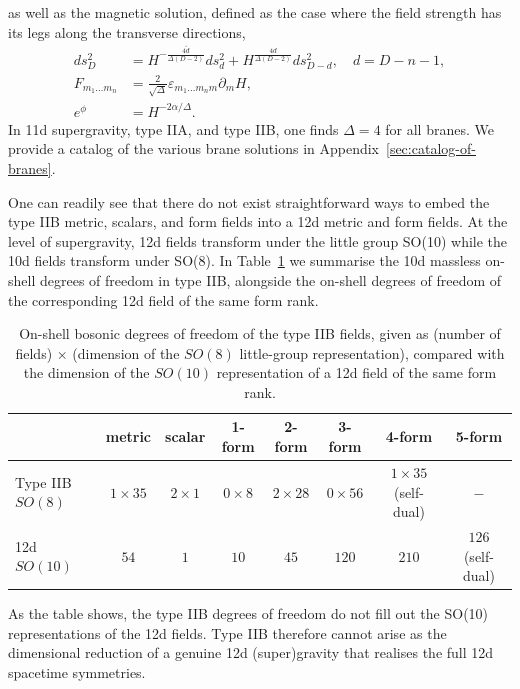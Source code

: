 as well as the magnetic solution, defined as the case where the field strength has its legs along the transverse directions,
\begin{equation}
\begin{aligned}
ds_D^2
&=H^{-\frac{4\tilde d}{\Delta(D-2)}}ds_{d}^2+
H^{\frac{4d}{\Delta(D-2)}}ds_{D-d}^2,\quad
d = D-n-1,\\
F_{m_1...m_n}
&= \frac{2}{\sqrt{\Delta}}\varepsilon_{m_1...m_n m}\partial_m H,\\
e^\phi &= H^{-2\alpha/\Delta}.
\end{aligned}
\end{equation}
In 11d supergravity, type IIA, and type IIB, one finds $\Delta = 4$ for all branes.
We provide a catalog of the various brane solutions in Appendix~\ref{sec:catalog-of-branes}.

One can readily see that there do not exist straightforward ways to embed the type IIB metric, scalars, and form fields into a 12d metric and form fields.
At the level of supergravity, 12d fields transform under the little group SO(10) while the 10d fields transform under SO(8).
In Table~\ref{tab:10d-12d-dof} we summarise the 10d massless on-shell degrees of freedom in type IIB, alongside the on-shell degrees of freedom of the corresponding 12d field of the same form rank.

\begin{table}[h]
\centering
\begin{tabular}{l|ccccccc}
\hline
 & metric & scalar & 1-form & 2-form & 3-form & 4-form & 5-form \\
\hline
Type IIB $SO(8)$ & $1\times 35$ & $2\times 1$ & $0\times 8$ & $2\times 28$ & $0\times 56$ & $1\times 35$ (self-dual) & $-$ \\
12d $SO(10)$ & $54$ & $1$ & $10$ & $45$ & $120$ & $210$ & $126$ (self-dual) \\
\hline
\end{tabular}
\caption{
On-shell bosonic degrees of freedom of the type IIB fields, given as (number of fields) $\times$ (dimension of the $SO(8)$ little-group representation), compared with the dimension of the $SO(10)$ representation of a 12d field of the same form rank.
}
\label{tab:10d-12d-dof}
\end{table}
As the table shows, the type IIB degrees of freedom do not fill out the SO(10) representations of the 12d fields. 
Type IIB therefore cannot arise as the dimensional reduction of a genuine 12d (super)gravity that realises the full 12d spacetime symmetries.

